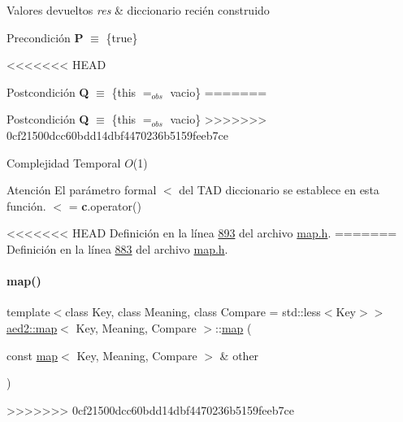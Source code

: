 \begin{DoxyRetVals}{Valores devueltos}
{\em res} & diccionario recién construido\\
\hline
\end{DoxyRetVals}
\begin{DoxyPrecond}{Precondición}
{\bfseries P} $\equiv$ \{true\} 
\end{DoxyPrecond}
<<<<<<< HEAD
\begin{DoxyPostcond}{\-Postcondición}
{\bfseries \-Q} $\equiv$ \{this $=_{obs}$ vacio\}
=======
\begin{DoxyPostcond}{Postcondición}
{\bfseries Q} $\equiv$ \{this $=_{obs}$ vacio\}
>>>>>>> 0cf21500dcc60bdd14dbf4470236b5159feeb7ce
\end{DoxyPostcond}

\begin{DoxyDescription}
\item[Complejidad Temporal]$O$(1)
\end{DoxyDescription}

\begin{DoxyAttention}{Atención}
El parámetro formal $<$ del T\+AD diccionario se establece en esta función. $<$ = {\bfseries c}.operator() 
\end{DoxyAttention}


<<<<<<< HEAD
\-Definición en la línea \hyperlink{map_8h_source_l00893}{893} del archivo \hyperlink{map_8h_source}{map.\-h}.
=======
Definición en la línea \hyperlink{map_8h_source_l00883}{883} del archivo \hyperlink{map_8h_source}{map.\+h}.

\mbox{\label{classaed2_1_1map_a7a77950a3d8e637bfa7cf5dcd904f257_a7a77950a3d8e637bfa7cf5dcd904f257}} 
\paragraph{\texorpdfstring{map()}{map()}\hspace{0.1cm}{\footnotesize\ttfamily [2/3]}}
{\footnotesize\ttfamily template$<$class Key, class Meaning, class Compare = std\+::less$<$\+Key$>$$>$ \\
\hyperlink{classaed2_1_1map}{aed2\+::map}$<$ Key, Meaning, Compare $>$\+::\hyperlink{classaed2_1_1map}{map} (\begin{DoxyParamCaption}\item[{const \hyperlink{classaed2_1_1map}{map}$<$ Key, Meaning, Compare $>$ \&}]{other }\end{DoxyParamCaption})\hspace{0.3cm}{\ttfamily [inline]}}
>>>>>>> 0cf21500dcc60bdd14dbf4470236b5159feeb7ce




\end{DoxyPostcond}
